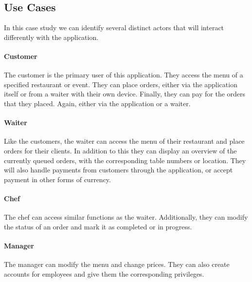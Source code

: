 \documentclass[12pt]{article}
\begin{document}
\begin{multicols}{2}
\subsection{Use Cases}
In this case study we can identify several distinct actors that will interact differently with the application.
\paragraph{Customer}
The customer is the primary user of this application. They access the menu of a specified restaurant or event. They can place orders, either via the application itself or from a waiter with their own device. Finally, they can pay for the orders that they placed. Again, either via the application or a waiter.
\paragraph{Waiter}
Like the customers, the waiter can access the menu of their restaurant and place orders for their clients. In addition to this they can display an overview of the currently queued orders, with the corresponding table numbers or location. They will also handle payments from customers through the application, or accept payment in other forms of currency.
\paragraph{Chef}
The chef can access similar functions as the waiter. Additionally, they can modify the status of an order and mark it as completed or in progress.
\paragraph{Manager}
The manager can modify the menu and change prices. They can also create accounts for employees and give them the corresponding privileges.\\


\end{multicols}
\end{document}
